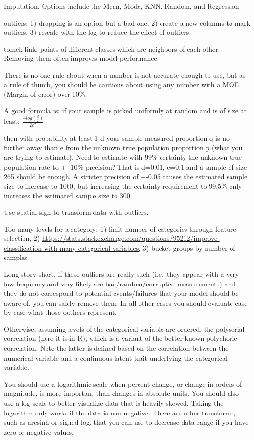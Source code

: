 \documentclass[]{book}
\begin{document}
Imputation. Options include the Mean, Mode, KNN, Random, and Regression

outliers: 1) dropping is an option but a bad one, 2) create a new columns to mark outliers, 3) rescale with the log to reduce the effect of outliers

tomek link: points of different classes which are neighbors of each other. Removing them often improves model performance

There is no one rule about when a number is not accurate enough to use, but as a rule of thumb, you should be cautious about using any number with a MOE (Margin-of-error) over 10\%.

A good formula is: if your sample is picked uniformly at random and is of size at least: \(\frac{-log(\frac{d}{2})}{2e^2}\)

then with probability at least 1-d your sample measured proportion q is no further away than e from the unknown true population proportion p (what you are trying to estimate). Need to estimate with 99\% certainty the unknown true population rate to +- 10\% precision? That is d=0.01, e=0.1 and a sample of size 265 should be enough. A stricter precision of +-0.05 causes the estimated sample size to increase to 1060, but increasing the certainty requirement to 99.5\% only increases the estimated sample size to 300.

Use spatial sign to transform data with outliers.

Too many levels for a category: 1) limit number of categories through feature selection, 2) \url{https://stats.stackexchange.com/questions/95212/improve-classification-with-many-categorical-variables}, 3) bucket groups by number of samples

Long story short, if these outliers are really such (i.e.~they appear with a very low frequency and very likely are bad/random/corrupted measurements) and they do not correspond to potential events/failures that your model should be aware of, you can safely remove them. In all other cases you should evaluate case by case what those outliers represent.

Otherwise, assuming levels of the categorical variable are ordered, the polyserial correlation (here it is in R), which is a variant of the better known polychoric correlation. Note the latter is defined based on the correlation between the numerical variable and a continuous latent trait underlying the categorical variable.

You should use a logarithmic scale when percent change, or change in orders of magnitude, is more important than changes in absolute units. You should also use a log scale to better visualize data that is heavily skewed. Taking the logarithm only works if the data is non-negative. There are other transforms, such as arcsinh or signed log, that you can use to decrease data range if you have zero or negative values.
\end{document}
